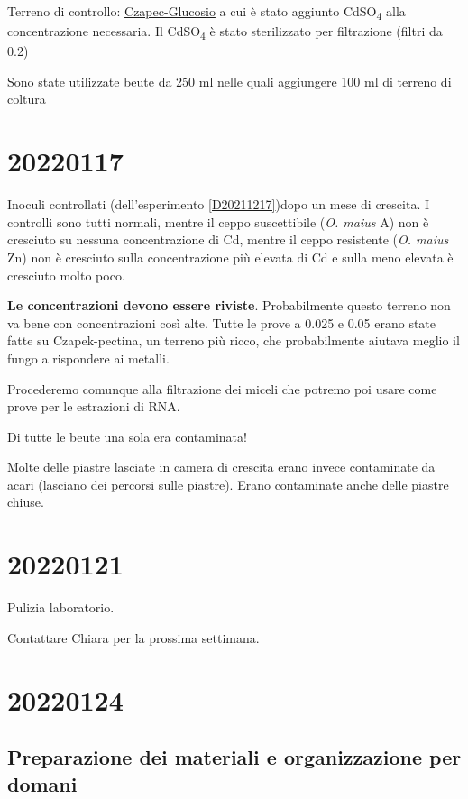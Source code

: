 \documentclass[
]{book}
\begin{document}
Terreno di controllo: \href{Documents/media1.pdf}{Czapec-Glucosio} a cui è stato aggiunto CdSO\textsubscript{4} alla concentrazione necessaria. Il CdSO\textsubscript{4} è stato sterilizzato per filtrazione (filtri da 0.2)

Sono state utilizzate beute da 250 ml nelle quali aggiungere 100 ml di terreno di coltura

\hypertarget{D20220117}{%
\section{20220117}\label{D20220117}}

Inoculi controllati (dell'esperimento \ref{D20211217})dopo un mese di crescita. I controlli sono tutti normali, mentre il ceppo suscettibile (\emph{O. maius} A) non è cresciuto su nessuna concentrazione di Cd, mentre il ceppo resistente (\emph{O. maius} Zn) non è cresciuto sulla concentrazione più elevata di Cd e sulla meno elevata è cresciuto molto poco.

\textbf{Le concentrazioni devono essere riviste}. Probabilmente questo terreno non va bene con concentrazioni così alte. Tutte le prove a 0.025 e 0.05 erano state fatte su Czapek-pectina, un terreno più ricco, che probabilmente aiutava meglio il fungo a rispondere ai metalli.

Procederemo comunque alla filtrazione dei miceli che potremo poi usare come prove per le estrazioni di RNA.

Di tutte le beute una sola era contaminata!

Molte delle piastre lasciate in camera di crescita erano invece contaminate da acari (lasciano dei percorsi sulle piastre). Erano contaminate anche delle piastre chiuse.

\hypertarget{D20220121}{%
\section{20220121}\label{D20220121}}

Pulizia laboratorio.

Contattare Chiara per la prossima settimana.

\hypertarget{D20220124}{%
\section{20220124}\label{D20220124}}

\hypertarget{preparazione-dei-materiali-e-organizzazione-per-domani}{%
\subsection{Preparazione dei materiali e organizzazione per domani}\label{preparazione-dei-materiali-e-organizzazione-per-domani}}
\end{document}
